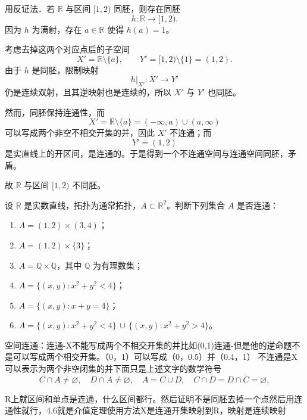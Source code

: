 \begin{solution}
用反证法．若 $\mathbb{R}$ 与区间 $[1,2)$ 同胚，则存在同胚
\[
h:\mathbb{R}\longrightarrow[1,2).
\]
因为 $h$ 为满射，存在 $a\in\mathbb{R}$ 使得 $h(a)=1$。

考虑去掉这两个对应点后的子空间
\[
X'=\mathbb{R}\setminus\{a\},\qquad
Y'=[1,2)\setminus\{1\}=(1,2).
\]
由于 $h$ 是同胚，限制映射
\[
h|_{X'}:X'\longrightarrow Y'
\]
仍是连续双射，且其逆映射也是连续的，所以 $X'$ 与 $Y'$ 也同胚。

然而，同胚保持连通性，而
\[
X'=\mathbb{R}\setminus\{a\}=(-\infty,a)\cup(a,\infty)
\]
可以写成两个非空不相交开集的并，因此 $X'$ 不连通；而
\[
Y'=(1,2)
\]
是实直线上的开区间，是连通的。于是得到一个不连通空间与连通空间同胚，矛盾。

故 $\mathbb{R}$ 与区间 $[1,2)$ 不同胚。
\end{solution}
\begin{homework}[4.9]
设 $\mathbb{R}$ 是实数直线，拓扑为通常拓扑，$A\subset\mathbb{R}^2$。判断下列集合 $A$ 是否连通：
\begin{enumerate}
  \item $A=(1,2)\times(3,4)$；
  \item $A=(1,2)\times\{3\}$；
  \item $A=\mathbb{Q}\times\mathbb{Q}$，其中 $\mathbb{Q}$ 为有理数集；
  \item $A=\{(x,y):x^{2}+y^{2}<4\}$；
  \item $A=\{(x,y):x+y=4\}$；
  \item $A=\{(x,y):x^{2}+y^{2}<4\}\,\cup\,\{(x,y):x^{2}+y^{2}>4\}$。
\end{enumerate}
\end{homework}
\begin{dxtips}
    空间连通：连通-X不能写成两个不相交开集的并比如(0,1)连通-但是他的逆命题不是可以写成两个相交开集。（0，1）可以写成（0，0.5）并（0.4，1）
    不连通是X可以表示为两个非空闭集的并下面只是上述文字的数学符号
\[
C\cap A\neq\varnothing,\quad D\cap A\neq\varnothing,\quad A=C\cup D,
\quad C\cap \overline{D}=D\cap \overline{C}=\varnothing,
\]
\end{dxtips}
\begin{dxtips}
    R上就区间和单点是连通，什么区间都行。然后证明不是同胚去掉一个点然后用连通性就行，4.6就是介值定理使用方法X是连通开集映射到R，映射是连续映射
\end{dxtips}
